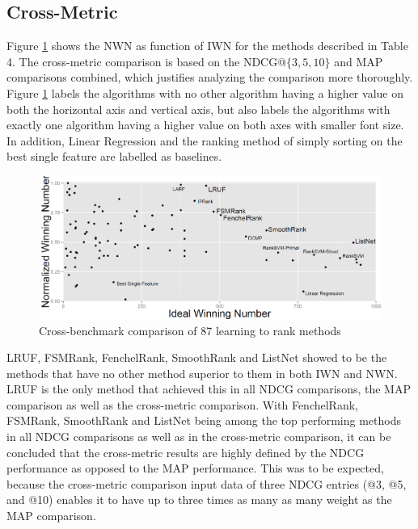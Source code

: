 \documentclass{llncs}
\begin{document}
\subsection{Cross-Metric}
Figure \ref{fig:normalized_winning_number_all} shows the NWN as function of IWN for the methods described in Table 4. The cross-metric comparison is based on the NDCG@$\{3,5,10\}$ and MAP comparisons combined, which justifies analyzing the comparison more thoroughly. Figure \ref{fig:normalized_winning_number_all} labels the algorithms with no other algorithm having a higher value on both the horizontal axis and vertical axis, but also labels the algorithms with exactly one algorithm having a higher value on both axes with smaller font size. In addition, Linear Regression and the ranking method of simply sorting on the best single feature are labelled as baselines.
\begin{figure}
\centering
\includegraphics[scale=0.21]{gfx/combined_normalized_winnum}
\caption{Cross-benchmark comparison of 87 learning to rank methods}
\label{fig:normalized_winning_number_all}
\end{figure}
\vspace{-0.1in}
LRUF, FSMRank, FenchelRank, SmoothRank and ListNet showed to be the methods that have no other method superior to them in both IWN and NWN. LRUF is the only method that achieved this in all NDCG comparisons, the MAP comparison as well as the cross-metric comparison. With FenchelRank, FSMRank, SmoothRank and ListNet being among the top performing methods in all NDCG comparisons as well as in the cross-metric comparison, it can be concluded that the cross-metric results are highly defined by the NDCG performance as opposed to the MAP performance. This was to be expected, because the cross-metric comparison input data of three NDCG entries (@3, @5, and @10) enables it to have up to three times as many as many weight as the MAP comparison.\\
\end{document}
